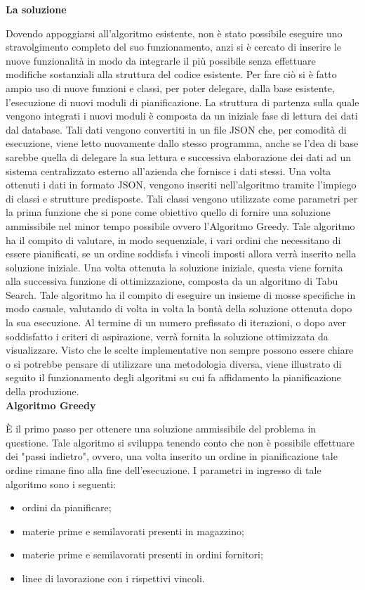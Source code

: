 \textbf{La soluzione}

Dovendo appoggiarsi all'algoritmo esistente, non è stato possibile eseguire uno stravolgimento completo del suo funzionamento, anzi si è cercato di inserire le nuove funzionalità
in modo da integrarle il più possibile senza effettuare modifiche sostanziali alla struttura del codice esistente. Per fare ciò si è fatto ampio uso di nuove funzioni e classi, per poter
delegare, dalla base esistente, l'esecuzione di nuovi moduli di pianificazione. La struttura di partenza sulla quale vengono integrati i nuovi moduli è composta da un iniziale
fase di lettura dei dati dal database. Tali dati vengono convertiti in un file JSON che, per comodità di esecuzione, viene letto nuovamente dallo stesso programma, anche se
l'dea di base sarebbe quella di delegare la sua lettura e successiva elaborazione dei dati ad un sistema centralizzato esterno all'azienda che fornisce i dati stessi.
Una volta ottenuti i dati in formato JSON, vengono inseriti nell'algoritmo tramite l'impiego di classi e strutture predisposte. Tali classi vengono utilizzate come parametri
per la prima funzione che si pone come obiettivo quello di fornire una soluzione ammissibile nel minor tempo possibile ovvero l'Algoritmo Greedy\glo. Tale algoritmo ha il compito
di valutare, in modo sequenziale, i vari ordini che necessitano di essere pianificati, se un ordine soddisfa i vincoli imposti allora verrà inserito nella soluzione iniziale.
Una volta ottenuta la soluzione iniziale, questa viene fornita alla successiva funzione di ottimizzazione, composta da un algoritmo di Tabu Search\glo. Tale algoritmo ha il compito
di eseguire un insieme di mosse specifiche in modo casuale, valutando di volta in volta la bontà della soluzione ottenuta dopo la sua esecuzione. Al termine di un numero prefissato
di iterazioni, o dopo aver soddisfatto i criteri di aspirazione, verrà fornita la soluzione ottimizzata da visualizzare.
Visto che le scelte implementative non sempre possono essere chiare o si potrebbe pensare di utilizzare una metodologia diversa, viene illustrato di seguito il funzionamento
degli algoritmi su cui fa affidamento la pianificazione della produzione.\\

\textbf{Algoritmo Greedy}

È il primo passo per ottenere una soluzione ammissibile del problema in questione. Tale algoritmo si sviluppa tenendo conto che non è possibile effettuare dei "passi indietro",
ovvero, una volta inserito un ordine in pianificazione tale ordine rimane fino alla fine dell'esecuzione. I parametri in ingresso di tale algoritmo sono i seguenti:
\begin{itemize}
    \item ordini da pianificare;
    \item materie prime e semilavorati presenti in magazzino;
    \item materie prime e semilavorati presenti in ordini fornitori;
    \item linee di lavorazione con i rispettivi vincoli.
\end{itemize}

